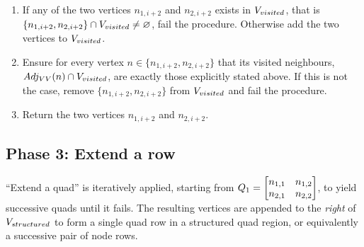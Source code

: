 \begin{enumerate}


\item If any of the two vertices $n_{1,i+2}$ and $n_{2,i+2}$ exists in $V_{visited}$, that is $\{ n_{1,i+2} , n_{2,i+2} \} \cap V_{visited} \neq \varnothing$, fail the procedure.
Otherwise add the two vertices to $V_{visited}$.

\item Ensure for every vertex $n \in \{ n_{1,i+2} , n_{2,i+2} \}$ that its visited neighbours, $Adj_{VV}(n) \cap V_{visited}$, are exactly those explicitly stated above. If this is not the case, remove $\{ n_{1,i+2} , n_{2,i+2} \}$ from $V_{visited}$ and fail the procedure.

\item Return the two vertices $n_{1,i+2}$ and $n_{2,i+2}$.
\end{enumerate}








\subsection{Phase 3: Extend a row}
``Extend a quad'' is iteratively applied, starting from $Q_1 = \begin{bmatrix} n_{1,1} & n_{1,2} \\ n_{2,1} & n_{2,2} \end{bmatrix}$, to yield successive quads until it fails.
The resulting vertices are appended to the \emph{right} of $V_{structured}$ to form a single quad row in a structured quad region, or equivalently a successive pair of node rows.

